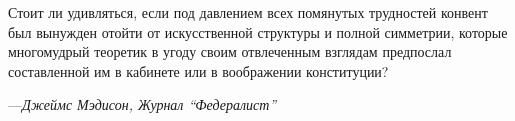\newpage 

\null
\vskip 1in

\begingroup
\raggedright
\list{}{\rightmargin=8pc \leftmargin=8pc}\item[] \small
Стоит ли удивляться, если под давлением всех помянутых трудностей конвент был
вынужден отойти от искусственной структуры и полной симметрии, которые
многомудрый теоретик в угоду своим отвлеченным взглядам предпослал составленной
им в кабинете или в воображении конституции?

\par\vskip 4pt
\begin{tabbing}
---\={\it Джеймс Мэдисон, Журнал ``Федералист''} \\
 \\
\end{tabbing}
\endlist
\endgroup

